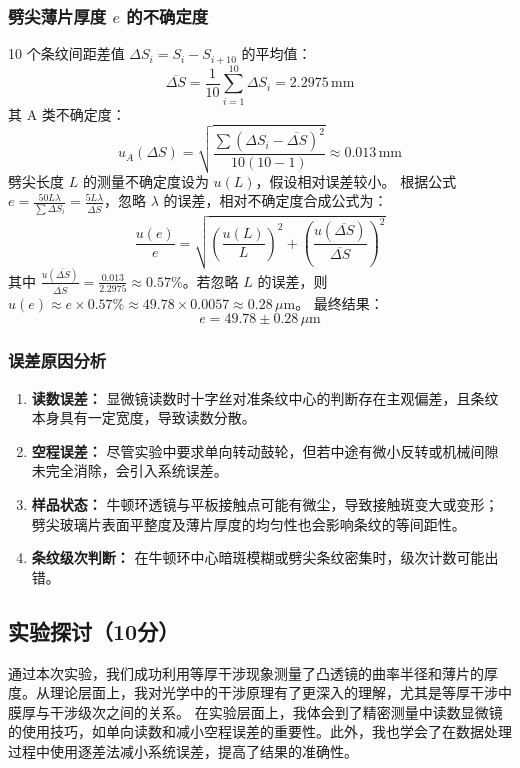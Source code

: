 \documentclass[]{../../templates/Report}%
\begin{document}
\begin{fullreportonly}
\subsubsection{劈尖薄片厚度 $e$ 的不确定度}
10 个条纹间距差值 $\Delta S_i = S_i - S_{i+10}$ 的平均值：
\[ \overline{\Delta S} = \frac{1}{10} \sum_{i=1}^{10} \Delta S_i = 2.2975 \, \text{mm} \]
其 A 类不确定度：
\[ u_A(\Delta S) = \sqrt{\frac{\sum (\Delta S_i - \overline{\Delta S})^2}{10(10-1)}} \approx 0.013 \, \text{mm} \]
劈尖长度 $L$ 的测量不确定度设为 $u(L)$，假设相对误差较小。
根据公式 $e = \frac{50 L \lambda}{\sum \Delta S_i} = \frac{5 L \lambda}{\overline{\Delta S}}$，忽略 $\lambda$ 的误差，相对不确定度合成公式为：
\[ \frac{u(e)}{e} = \sqrt{\left(\frac{u(L)}{L}\right)^2 + \left(\frac{u(\overline{\Delta S})}{\overline{\Delta S}}\right)^2} \]
其中 $\frac{u(\overline{\Delta S})}{\overline{\Delta S}} = \frac{0.013}{2.2975} \approx 0.57\%$。若忽略 $L$ 的误差，则 $u(e) \approx e \times 0.57\% \approx 49.78 \times 0.0057 \approx 0.28 \, \mu\text{m}$。
最终结果：
\[ e = 49.78 \pm 0.28 \, \mu\text{m} \]

\subsubsection{误差原因分析}
\begin{enumerate}
    \item \textbf{读数误差：} 显微镜读数时十字丝对准条纹中心的判断存在主观偏差，且条纹本身具有一定宽度，导致读数分散。
    \item \textbf{空程误差：} 尽管实验中要求单向转动鼓轮，但若中途有微小反转或机械间隙未完全消除，会引入系统误差。
    \item \textbf{样品状态：} 牛顿环透镜与平板接触点可能有微尘，导致接触斑变大或变形；劈尖玻璃片表面平整度及薄片厚度的均匀性也会影响条纹的等间距性。
    \item \textbf{条纹级次判断：} 在牛顿环中心暗斑模糊或劈尖条纹密集时，级次计数可能出错。
\end{enumerate}
\subsection{实验探讨（10分）}
通过本次实验，我们成功利用等厚干涉现象测量了凸透镜的曲率半径和薄片的厚度。从理论层面上，我对光学中的干涉原理有了更深入的理解，尤其是等厚干涉中膜厚与干涉级次之间的关系。
在实验层面上，我体会到了精密测量中读数显微镜的使用技巧，如单向读数和减小空程误差的重要性。此外，我也学会了在数据处理过程中使用逐差法减小系统误差，提高了结果的准确性。


\end{fullreportonly}
\end{document}
